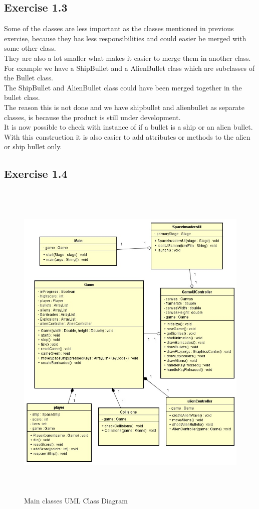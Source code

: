 \documentclass[10pt]{article}
\begin{document}
 \subsection*{Exercise 1.3} 
Some of the classes are less important as the classes mentioned in previous exercise, because they has less responsibilities and could easier be merged with some other class.\\
They are also a lot smaller what makes it easier to merge them in another class. For example we have a ShipBullet and a AlienBullet class which are subclasses of the Bullet class. \\
 The ShipBullet and AlienBullet class could have been merged together in the bullet class. \\
The reason this is not done and we have shipbullet and alienbullet as separate classes, is because the product is still under development. \\
It is now possible to check with instance of if a bullet is a ship or an alien bullet. \\
With this construction it is also easier to add attributes or methods to the alien or ship bullet only.\\
 \pagebreak

 \subsection*{Exercise 1.4} 
\begin{figure}[ht!]
\centering
\includegraphics[width=14cm, height=16cm]{UMLSEM.jpg}
\caption{Main classes UML Class Diagram}
\end{figure}
\pagebreak
\end{document}
